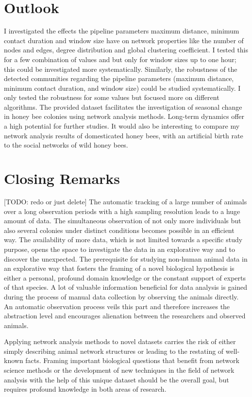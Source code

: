 \section{Outlook}
I investigated the effects the pipeline parameters maximum distance, minimum contact duration and window size have on network properties like the number of nodes and edges, degree distribution and global clustering coefficient. I tested this for a few combination of values and but only for window sizes up to one hour; this could be investigated more systematically.
Similarly, the robustness of the detected communities regarding the pipeline parameters (maximum distance, minimum contact duration, and window size)  could be studied systematically. I only tested the robustness for some values but focused more on different algorithms.
The provided dataset facilitates the investigation of seasonal change in honey bee colonies using network analysis methods. Long-term dynamics offer a high potential for further studies.
It would also be interesting to compare my network analysis results of domesticated honey bees, with an artificial birth rate to the social networks of wild honey bees.


\section{Closing Remarks}
[TODO: redo or just delete]
The automatic tracking of a large number of animals over a long observation periods with a high sampling resolution leads to a huge amount of data.
The simultaneous observation of not only more individuals but also several colonies under distinct conditions becomes possible in an efficient way.
The availability of more data, which is not limited towards a specific study purpose, opens the space to investigate the data in an explorative way and to discover the unexpected.
The prerequisite for studying non-human animal data in an explorative way that fosters the framing of a novel biological hypothesis is either a personal, profound domain knowledge or the constant support of experts of that species.
A lot of valuable information beneficial for data analysis is gained during the process of manual data collection by observing the animals directly. An automatic observation process veils this part and therefore increases the abstraction level and encourages alienation between the researchers and observed animals.

Applying network analysis methods to novel datasets carries the risk of either simply describing animal network structures or leading to the restating of well-known facts. Framing important biological questions that benefit from network science methods or the development of new techniques in the field of network analysis with the help of this unique dataset should be the overall goal, but requires profound knowledge in both areas of research.